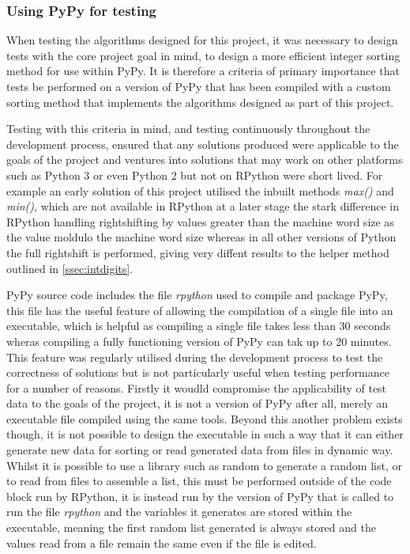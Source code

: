 \documentclass[12pt]{article}
\begin{document}
\subsubsection{Using PyPy for testing}
When testing the algorithms designed for this project, it was necessary to design tests with the core project goal in mind, to design a more efficient integer sorting method for use within PyPy. It is therefore a criteria of primary importance that tests be performed on a version of PyPy that has been compiled with a custom sorting method that implements the algorithms designed as part of this project. 
\par 
Testing with this criteria in mind, and testing continuously throughout the development process, ensured that any solutions produced were applicable to the goals of the project and ventures into solutions that may work on other platforms such as Python 3 or even Python 2 but not on RPython were short lived. For example an early solution of this project utilised the inbuilt methods \textit{max()} and \textit{min()}, which are not available in RPython at a later stage the stark difference in RPython handling rightshifting by values greater than the machine word size as the value moldulo the machine word size whereas in all other versions of Python the full rightshift is performed, giving very diffent results to the helper method outlined in \ref{ssec:intdigits}.
\par 
PyPy source code includes the file \textit{rpython} used to compile and package PyPy, this file has the useful feature of allowing the compilation of a single file into an executable, which is helpful as compiling a single file takes less than 30 seconds wheras compiling a fully functioning version of PyPy can tak up to 20 minutes. This feature was regularly utilised during the development process to test the correctness of solutions but is not particularly useful when testing performance for a number of reasons. Firstly it woudld compromise the applicability of test data to the goals of the project, it is not a version of PyPy after all, merely an executable file compiled using the same tools. Beyond this another problem exists though, it is not possible to design the executable in such a way that it can either generate new data for sorting or read generated data from files in dynamic way. Whilst it is possible to use a library such as random to generate a random list, or to read from files to assemble a list, this must be performed outside of the code block run by RPython, it is instead run by the version of PyPy that is called to run the file \textit{rpython} and the variables it generates are stored within the executable, meaning the first random list generated is always stored and the values read from a file remain the same even if the file is edited.
\end{document}
